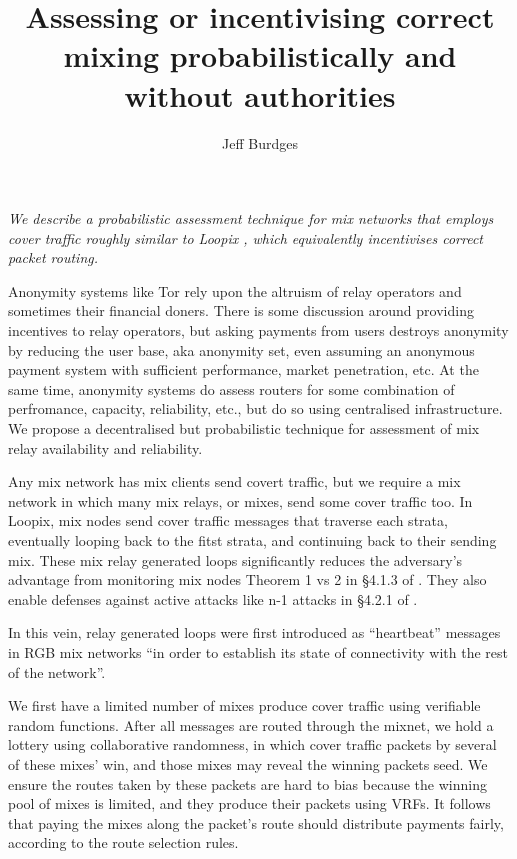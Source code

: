 ﻿\documentclass{sig-alternate-hotpets}
\title{Assessing or incentivising correct mixing probabilistically and without authorities}
\author{Jeff Burdges}
\date{}
\begin{document}
\maketitle

\begin{adjustwidth}{6pt}{8pt}
\it
We describe a probabilistic assessment technique for %
mix networks that employs cover traffic roughly similar to
Loopix \cite{Loopix}, which equivalently incentivises correct packet
routing.
\end{adjustwidth}
\medskip

Anonymity systems like Tor rely upon the altruism of relay operators and sometimes their financial doners.
There is some discussion around providing incentives to relay operators, but asking payments from users destroys anonymity by reducing the user base, aka anonymity set, even assuming an anonymous payment system with sufficient performance, market penetration, etc.  
At the same time, anonymity systems do assess routers for some combination of perfromance, capacity, reliability, etc., but do so using centralised infrastructure. 
We propose a decentralised but probabilistic technique for assessment of mix relay availability and reliability.  

Any mix network has mix clients send covert traffic, but we require a mix network in which many mix relays, or mixes, send some cover traffic too.  
In Loopix, mix nodes send cover traffic messages that traverse each strata, eventually looping back to the fitst strata, and continuing back to their sending mix.  
These mix relay generated loops significantly reduces the adversary's advantage from monitoring mix nodes Theorem 1 vs 2 in \S4.1.3 of \cite{Loopix}.  %
They also enable defenses against active attacks like n-1 attacks in \S4.2.1 of \cite{Loopix}.  %

In this vein, relay generated loops were first introduced as ``heartbeat'' messages in RGB mix networks \cite{RGB_Heartbeat} ``in order to establish its state of connectivity with the rest of the network''.

We first have a limited number of mixes produce cover traffic using verifiable random functions.  
After all messages are routed through the mixnet, we hold a lottery using collaborative randomness, in which cover traffic packets by several of these mixes’ win, and those mixes may reveal the winning packets seed.  
We ensure the routes taken by these packets are hard to bias because the winning pool of mixes is limited, and they produce their packets using VRFs.  
It follows that paying the mixes along the packet’s route should distribute payments fairly, according to the route selection rules. 
\end{document}
